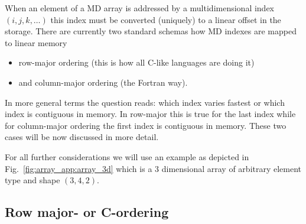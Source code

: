 When an element of a MD array is addressed by a multidimensional index
$(i,j,k,\hdots)$ this index must be converted (uniquely) to a linear offset in
the storage. There are currently two standard schemas how MD indexes are mapped
to linear memory
\begin{itemize}
\item row-major ordering (this is how all C-like languages are doing it)
\item and column-major ordering (the Fortran way).
\end{itemize}
In more general terms the question reads: which index varies fastest or which
index is contiguous in memory. In row-major this is true for the last index
while for column-major ordering the first index is contiguous in memory.
These two cases will be now discussed in more detail.

For all further considerations we will use an example as depicted in
Fig.~\ref{fig:array_app:array_3d} which is a 3 dimensional array of arbitrary
element type and shape $(3,4,2)$.

\subsection{Row major- or C-ordering}\label{sec:c_ordering}

